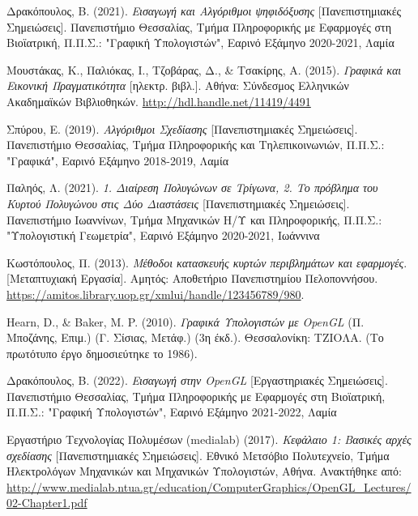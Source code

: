 

\begin{thebibliography}{16}


 Δρακόπουλος, Β. (2021). \emph{Εισαγωγή και Αλγόριθμοι ψηφιδόξυσης} [Πανεπιστημιακές Σημειώσεις]. Πανεπιστήμιο Θεσσαλίας, Τμήμα Πληροφορικής με Εφαρμογές στη Βιοϊατρική, Π.Π.Σ.: "Γραφική Υπολογιστών", Εαρινό Εξάμηνο 2020-2021, Λαμία

 Μουστάκας, Κ., Παλιόκας, Ι., Τζοβάρας, Δ., \& Τσακίρης, Α. (2015). \textit{Γραφικά και Εικονική Πραγματικότητα} [ηλεκτρ. βιβλ.]. Αθήνα: Σύνδεσμος Ελληνικών Ακαδημαϊκών Βιβλιοθηκών. \textlatin{\url{http://hdl.handle.net/11419/4491}}

 Σπύρου, Ε. (2019). \emph{Αλγόριθμοι Σχεδίασης} [Πανεπιστημιακές Σημειώσεις]. Πανεπιστήμιο Θεσσαλίας, Τμήμα Πληροφορικής και Τηλεπικοινωνιών, Π.Π.Σ.: "Γραφικά", Εαρινό Εξάμηνο 2018-2019, Λαμία

 Παληός, Λ. (2021). \emph{1. Διαίρεση Πολυγώνων σε Τρίγωνα, 2. Το πρόβλημα του Κυρτού Πολυγώνου στις Δύο Διαστάσεις} [Πανεπιστημιακές Σημειώσεις]. Πανεπιστήμιο Ιωαννίνων, Τμήμα Μηχανικών Η/Υ και Πληροφορικής, Π.Π.Σ.: "Υπολογιστική Γεωμετρία", Εαρινό Εξάμηνο 2020-2021, Ιωάννινα

 Κωστόπουλος, Π. (2013). \emph{Μέθοδοι κατασκευής κυρτών περιβλημάτων και εφαρμογές}. [Μεταπτυχιακή Εργασία]. Αμητός: Αποθετήριο Πανεπιστημίου Πελοποννήσου. \textlatin{\url{https://amitos.library.uop.gr/xmlui/handle/123456789/980}}.

 \textlatin{Hearn, D., \& Baker, M. P.} (2010). \emph{Γραφικά Υπολογιστών με \textlatin{OpenGL}} (Π. Μποζάνης, Επιμ.) (Γ. Σίσιας, Μετάφ.) (3η έκδ.). Θεσσαλονίκη: ΤΖΙΟΛΑ. (Το πρωτότυπο έργο δημοσιεύτηκε το 1986).

 Δρακόπουλος, Β. (2022). \emph{Εισαγωγή στην \textlatin{OpenGL}} [Εργαστηριακές Σημειώσεις]. Πανεπιστήμιο Θεσσαλίας, Τμήμα Πληροφορικής με Εφαρμογές στη Βιοϊατρική, Π.Π.Σ.: "Γραφική Υπολογιστών", Εαρινό Εξάμηνο 2021-2022, Λαμία

 Εργαστήριο Τεχνολογίας Πολυμέσων (\textlatin{medialab}) (2017). \emph{Κεφάλαιο 1: Βασικές αρχές σχεδίασης} [Πανεπιστημιακές Σημειώσεις]. Εθνικό Μετσόβιο Πολυτεχνείο, Τμήμα Ηλεκτρολόγων Μηχανικών και Μηχανικών Υπολογιστών, Αθήνα. Ανακτήθηκε από: \textlatin{\url{ http://www.medialab.ntua.gr/education/ComputerGraphics/OpenGL_Lectures/02-Chapter1.pdf}}


\end{thebibliography}

